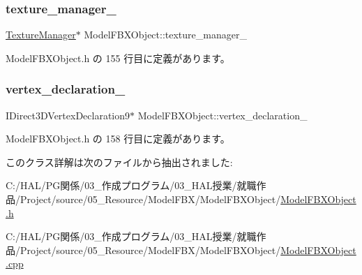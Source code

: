 \subsubsection{\texorpdfstring{texture\+\_\+manager\+\_\+}{texture\_manager\_}}
{\footnotesize\ttfamily \mbox{\hyperlink{class_texture_manager}{Texture\+Manager}}$\ast$ Model\+F\+B\+X\+Object\+::texture\+\_\+manager\+\_\+\hspace{0.3cm}{\ttfamily [private]}}



 Model\+F\+B\+X\+Object.\+h の 155 行目に定義があります。

\mbox{\label{class_model_f_b_x_object_a7b592156afe70e5dd416967a44bc1470}} 
\subsubsection{\texorpdfstring{vertex\+\_\+declaration\+\_\+}{vertex\_declaration\_}}
{\footnotesize\ttfamily I\+Direct3\+D\+Vertex\+Declaration9$\ast$ Model\+F\+B\+X\+Object\+::vertex\+\_\+declaration\+\_\+\hspace{0.3cm}{\ttfamily [private]}}



 Model\+F\+B\+X\+Object.\+h の 158 行目に定義があります。



このクラス詳解は次のファイルから抽出されました\+:\begin{DoxyCompactItemize}
\item 
C\+:/\+H\+A\+L/\+P\+G関係/03\+\_\+作成プログラム/03\+\_\+\+H\+A\+L授業/就職作品/\+Project/source/05\+\_\+\+Resource/\+Model\+F\+B\+X/\+Model\+F\+B\+X\+Object/\mbox{\hyperlink{_model_f_b_x_object_8h}{Model\+F\+B\+X\+Object.\+h}}\item 
C\+:/\+H\+A\+L/\+P\+G関係/03\+\_\+作成プログラム/03\+\_\+\+H\+A\+L授業/就職作品/\+Project/source/05\+\_\+\+Resource/\+Model\+F\+B\+X/\+Model\+F\+B\+X\+Object/\mbox{\hyperlink{_model_f_b_x_object_8cpp}{Model\+F\+B\+X\+Object.\+cpp}}\end{DoxyCompactItemize}
